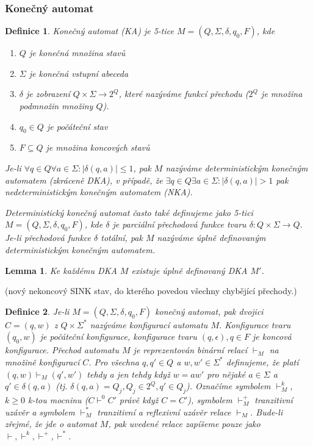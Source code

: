 \documentclass[a4paper, 11pt]{report}
\newtheorem{mydef}{Definice}[chapter]
\newtheorem{lemma}{Lemma}[chapter]
\begin{document}
\subsubsection{Konečný automat}
\begin{mydef}
Konečný automat (KA) je 5-tice $M = (Q, \Sigma, \delta, q_0, F)$, kde
\begin{enumerate}[(1)]
	\item $Q$ je konečná množina stavů
	\item $\Sigma$ je konečná vstupní abeceda
	\item $\delta$ je zobrazení $Q \times \Sigma \to 2^Q$, které nazýváme \emph{funkcí přechodu} ($2^Q$ je množina podmnožin množiny $Q$).
	\item $q_0 \in Q$ je počáteční stav
	\item $F \subseteq Q$ je množina koncových stavů
\end{enumerate}

Je-li $\forall q \in Q \forall a \in \Sigma: |\delta(q, a)| \leq 1$, pak $M$ nazýváme \emph{deterministickým konečným automatem} (zkráceně DKA), v případě, že $\exists q \in Q \exists a \in \Sigma : | \delta(q, a)| > 1$ pak \emph{nedeterministickým konečným automatem (NKA)}.

\emph{Deterministický konečný automat} často také definujeme jako 5-tici $M = (Q, \Sigma, \delta, q_0, F)$, kde $\delta$ je \emph{parciální} přechodová funkce tvaru $\delta: Q \times \Sigma \to Q$. Je-li přechodová funkce $\delta$ totální, pak $M$ nazýváme \emph{úplně definovaným deterministickým konečným automatem}.
\end{mydef}

\begin{lemma}
Ke každému DKA $M$ existuje  úplně definovaný DKA $M'$.
\end{lemma}
(nový nekoncový SINK stav, do kterého povedou všechny chybějící přechody.)

\begin{mydef}
Je-li $M = (Q, \Sigma, \delta, q_0, F)$ konečný automat, pak dvojici $C = (q, w)$ z $Q \times \Sigma^*$ nazýváme konfigurací automatu $M$. Konfigurace tvaru $(q_0, w)$ je počáteční konfigurace, konfigurace tvaru $(q, \epsilon), q \in F$ je koncová konfigurace.
Přechod automatu $M$ je reprezentován binární relací $\vdash_M$ na množině konfigurací $C$.
Pro všechna $q, q' \in Q$ a $w, w' \in \Sigma^*$ definujeme, že platí $(q, w) \vdash_M (q', w')$ tehdy a jen tehdy když $w = aw'$ pro nějaké $a \in \Sigma$ a $q' \in \delta(q, a)$ (tj. $\delta(q, a) = Q_j, Q_j \in 2^Q, q' \in Q_j$).
Označíme symbolem $\vdash_M^k$, $k \geq 0$ k-tou mocninu ($C \vdash^0 C'$ právě když $C = C'$), symbolem $\vdash_M^+$ tranzitivní uzávěr a symbolem $\vdash_M^*$ tranzitivní a reflexivní uzávěr relace $\vdash_M$.
Bude-li zřejmé, že jde o automat $M$, pak uvedené relace zapíšeme pouze jako $\vdash, \vdash^k, \vdash^+, \vdash^*$.
\end{mydef}
\end{document}
